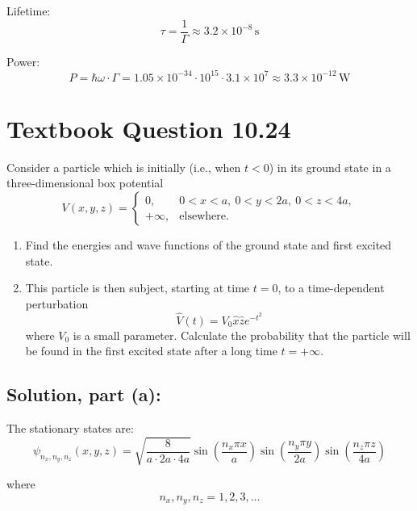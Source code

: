 \documentclass[12pt]{article}
\begin{document}
        \vspace{0.5em}
        \noindent
        Lifetime:
        \[
            \tau = \frac{1}{\Gamma} \approx \boxed{3.2 \times 10^{-8} \, \text{s}}
        \]
        
        \vspace{0.5em}
        \noindent
        Power:
        \[
            P = \hbar \omega \cdot \Gamma 
            = 1.05 \times 10^{-34} \cdot 10^{15} \cdot 3.1 \times 10^7 
            \approx \boxed{3.3 \times 10^{-12} \, \text{W}}
        \]

\section{Textbook Question 10.24}
    Consider a particle which is initially (i.e., when \( t < 0 \)) in its ground state in a three-dimensional box potential
    \[
        V(x, y, z) = 
        \begin{cases}
            0, & 0 < x < a,\ 0 < y < 2a,\ 0 < z < 4a, \\
            +\infty, & \text{elsewhere}.
        \end{cases}
    \]
    
    \begin{enumerate}
        \item[(a)] Find the energies and wave functions of the ground state and first excited state.
        
        \item[(b)] This particle is then subject, starting at time \( t = 0 \), to a time-dependent perturbation 
        \[
            \hat{V}(t) = V_0 \hat{x} \hat{z} e^{-t^2}
        \]
        where \( V_0 \) is a small parameter. Calculate the probability that the particle will be found in the first excited state after a long time \( t = +\infty \).
    \end{enumerate}

    \subsection{Solution, part (a):}
        The stationary states are:
        \[
            \psi_{n_x,n_y,n_z}(x, y, z) = \sqrt{\frac{8}{a \cdot 2a \cdot 4a}} \sin\left(\frac{n_x \pi x}{a}\right) \sin\left(\frac{n_y \pi y}{2a}\right) \sin\left(\frac{n_z \pi z}{4a}\right)
        \]
        
        where 
        \[ 
            n_x, n_y, n_z = 1, 2, 3, \dots 
        \]
        
\end{document}
